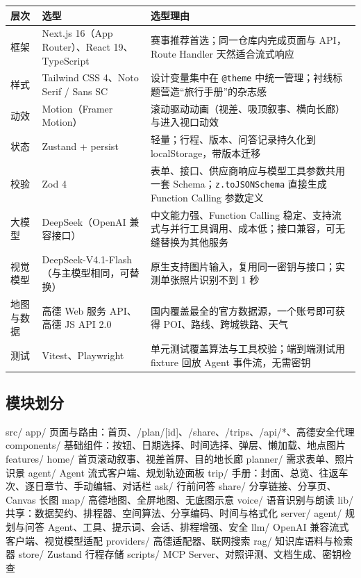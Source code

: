 \documentclass[a4paper]{article}
\newcommand{\thead}[1]{\textbf{#1}}
\newenvironment{doctable}[1]
  {\par\small\renewcommand{\arraystretch}{1.35}\setlength{\LTpre}{6pt}\setlength{\LTpost}{8pt}%
   \begin{longtable}{#1}\toprule\rowcolor{paperdeep}}
  {\bottomrule\end{longtable}}
\newcommand{\code}[1]{\texttt{\textcolor{pine}{#1}}}
\begin{document}
\begin{doctable}{>{\raggedright\arraybackslash}p{\dimexpr0.124\linewidth-2\tabcolsep\relax}>{\raggedright\arraybackslash}p{\dimexpr0.285\linewidth-2\tabcolsep\relax}>{\raggedright\arraybackslash}p{\dimexpr0.591\linewidth-2\tabcolsep\relax}}
\thead{层次} & \thead{选型} & \thead{选型理由} \\ \midrule
\endhead
框架 & Next.js 16（App Router）、React 19、TypeScript & 赛事推荐首选；同一仓库内完成页面与 API，Route Handler 天然适合流式响应 \\
样式 & Tailwind CSS 4、Noto Serif / Sans SC & 设计变量集中在 \code{@theme} 中统一管理；衬线标题营造“旅行手册”的杂志感 \\
动效 & Motion（Framer Motion） & 滚动驱动动画（视差、吸顶叙事、横向长廊）与进入视口动效 \\
状态 & Zustand + persist & 轻量；行程、版本、问答记录持久化到 localStorage，带版本迁移 \\
校验 & Zod 4 & 表单、接口、供应商响应与模型工具参数共用一套 Schema；\code{z.toJSONSchema} 直接生成 Function Calling 参数定义 \\
大模型 & DeepSeek（OpenAI 兼容接口） & 中文能力强、Function Calling 稳定、支持流式与并行工具调用、成本低；接口兼容，可无缝替换为其他服务 \\
视觉模型 & DeepSeek-V4.1-Flash（与主模型相同，可替换） & 原生支持图片输入，复用同一密钥与接口；实测单张照片识别不到 1 秒 \\
地图与数据 & 高德 Web 服务 API、高德 JS API 2.0 & 国内覆盖最全的官方数据源，一个账号即可获得 POI、路线、跨城铁路、天气 \\
测试 & Vitest、Playwright & 单元测试覆盖算法与工具校验；端到端测试用 fixture 回放 Agent 事件流，无需密钥 \\
\end{doctable}

\subsection{模块划分}

\begin{codeblock}
src/
  app/            页面与路由：首页、/plan/[id]、/share、/trips、/api/*、高德安全代理
  components/     基础组件：按钮、日期选择、时间选择、弹层、懒加载、地点图片
  features/
    home/         首页滚动叙事、视差首屏、目的地长廊
    planner/      需求表单、照片识景
    agent/        Agent 流式客户端、规划轨迹面板
    trip/         手册：封面、总览、往返车次、逐日章节、手动编辑、对话栏
    ask/          行前问答
    share/        分享链接、分享页、Canvas 长图
    map/          高德地图、全屏地图、无底图示意
    voice/        语音识别与朗读
  lib/            共享：数据契约、排程器、空间算法、分享编码、时间与格式化
  server/
    agent/        规划与问答 Agent、工具、提示词、会话、排程增强、安全
    llm/          OpenAI 兼容流式客户端、视觉模型适配
    providers/    高德适配器、联网搜索
    rag/          知识库语料与检索器
  store/          Zustand 行程存储
scripts/          MCP Server、对照评测、文档生成、密钥检查
\end{codeblock}
\end{document}
